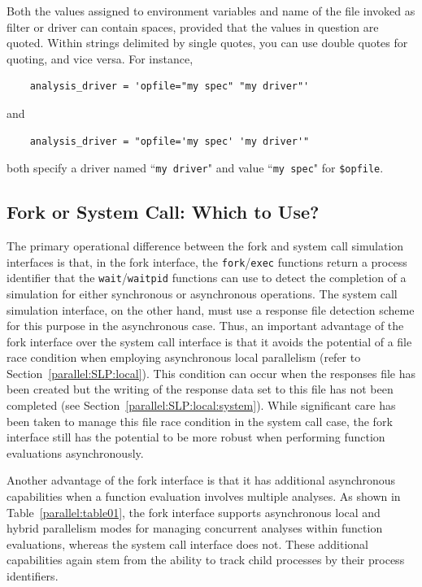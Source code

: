 Both the values assigned to environment variables and name of the
file invoked as filter or driver can contain spaces, provided that the values
in question are quoted.  Within strings delimited by single quotes,
you can use double quotes for quoting, and vice versa.  For instance,
\begin{verbatim}
    analysis_driver = 'opfile="my spec" "my driver"'
\end{verbatim}
and
\begin{verbatim}
    analysis_driver = "opfile='my spec' 'my driver'"
\end{verbatim}
both specify a driver named ``\texttt{my driver}" and value ``\texttt{my spec}"
for \texttt{\$opfile}.



\subsection{Fork or System Call: Which to Use?}\label{interfaces:which}

The primary operational difference between the fork and system call
simulation interfaces is that, in the fork interface, the
\texttt{fork}/\texttt{exec} functions return a process identifier
that the \texttt{wait}/\texttt{waitpid} functions can use
to detect the completion of a simulation for either synchronous or
asynchronous operations.  The system call simulation interface, on the
other hand, must use a response file detection scheme for this purpose
in the asynchronous case. Thus, an important advantage of the fork
interface over the system call interface is that it avoids the
potential of a file race condition when employing asynchronous local
parallelism (refer to Section~\ref{parallel:SLP:local}). This condition
can occur when the responses file has been created but the writing of
the response data set to this file has not been completed (see
Section~\ref{parallel:SLP:local:system}). While significant care has been
taken to manage this file race condition in the system call case, the
fork interface still has the potential to be more robust when
performing function evaluations asynchronously.

Another advantage of the fork interface is that it has additional
asynchronous capabilities when a function evaluation involves multiple
analyses. As shown in Table~\ref{parallel:table01}, the fork interface
supports asynchronous local and hybrid parallelism modes for managing
concurrent analyses within function evaluations, whereas the system
call interface does not. These additional capabilities again stem from
the ability to track child processes by their process
identifiers.

